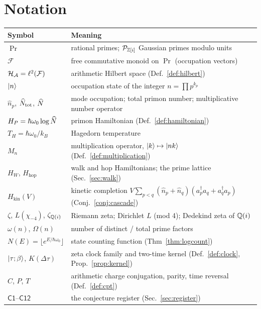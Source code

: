 
\appendix

\section{Notation}\label{app:notation}

\begin{center}
\begin{tabular}{@{}ll@{}}
\toprule
Symbol & Meaning\\
\midrule
$\Pr$ & rational primes; $\mathcal{P}_{\mathbb{Z}[i]}$ Gaussian primes modulo units\\
$\mathcal{F}$ & free commutative monoid on $\Pr$ (occupation vectors)\\
$\mathcal{H}_{\mathcal{A}}=\ell^{2}(\mathcal{F})$ & arithmetic Hilbert space (Def.~\ref{def:hilbert})\\
$\lvert n\rangle$ & occupation state of the integer $n=\prod p^{k_{p}}$\\
$\hat n_{p}$, $\widehat{N}_{\mathrm{tot}}$, $\widehat{N}$ & mode occupation; total primon number; multiplicative number operator\\
$H_{P}=\hbar\omega_{0}\log\widehat{N}$ & primon Hamiltonian (Def.~\ref{def:hamiltonian})\\
$T_{H}=\hbar\omega_{0}/k_{B}$ & Hagedorn temperature\\
$M_{n}$ & multiplication operator, $\lvert k\rangle\mapsto\lvert nk\rangle$ (Def.~\ref{def:multiplication})\\
$H_{W}$, $H_{\mathrm{hop}}$ & walk and hop Hamiltonians; the prime lattice
(Sec.~\ref{sec:walk})\\
$H_{\mathrm{kin}}(V)$ & kinetic completion $V\sum_{p<q}(\hat n_{p}+\hat n_{q})
(a_{p}^{\dagger}a_{q}+a_{q}^{\dagger}a_{p})$ (Conj.~\ref{conj:cascade})\\
$\zeta$, $L(\chi_{-4})$, $\zeta_{\mathbb{Q}(i)}$ & Riemann zeta; Dirichlet $L$ (mod 4); Dedekind zeta of $\mathbb{Q}(i)$\\
$\omega(n)$, $\Omega(n)$ & number of distinct / total prime factors\\
$N(E)=\lfloor e^{E/\hbar\omega_{0}}\rfloor$ & state counting function (Thm~\ref{thm:logcount})\\
$\lvert \tau;\beta\rangle$, $K(\Delta\tau)$ & zeta clock family and two-time kernel
(Def.~\ref{def:clock}, Prop.~\ref{prop:kernel})\\
$C$, $P$, $T$ & arithmetic charge conjugation, parity, time reversal
(Def.~\ref{def:cpt})\\
$\mathsf{C1}$--$\mathsf{C12}$ & the conjecture register (Sec.~\ref{sec:register})\\
\bottomrule
\end{tabular}
\end{center}
